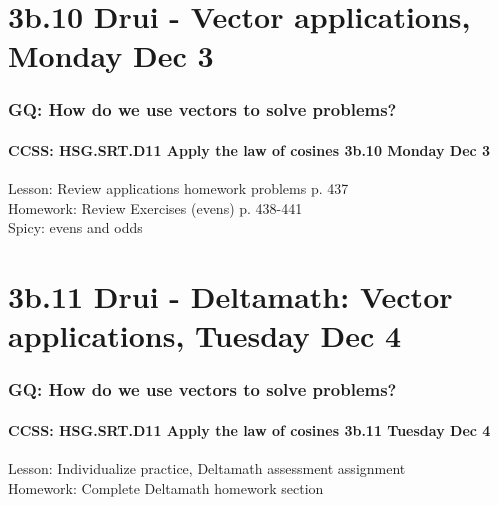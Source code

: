 \documentclass{beamer}
\begin{document}
  \section{3b.10 Drui - Vector applications, Monday Dec 3}
    \frame
    {
      \frametitle{GQ: How do we use vectors to solve problems?}
      \framesubtitle{CCSS: HSG.SRT.D11 Apply the law of cosines \qquad \alert{3b.10 Monday Dec 3}}


      Lesson: Review applications homework problems p. 437 \\
      Homework: Review Exercises (evens) p. 438-441\\
      Spicy: evens and odds\\[0.5cm]
    }

  \section{3b.11 Drui - Deltamath: Vector applications, Tuesday Dec 4}
    \frame
    {
      \frametitle{GQ: How do we use vectors to solve problems?}
      \framesubtitle{CCSS: HSG.SRT.D11 Apply the law of cosines \qquad \alert{3b.11 Tuesday Dec 4}}


      Lesson: Individualize practice, Deltamath assessment assignment \\
      Homework: Complete Deltamath homework section
    }
\end{document}
